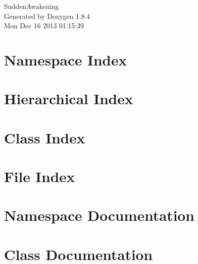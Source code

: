 \documentclass[twoside]{book}
\newcommand{\clearemptydoublepage}{%
  \newpage{\pagestyle{empty}\cleardoublepage}%
}
\begin{document}
\hypersetup{pageanchor=false}
\begin{titlepage}
\vspace*{7cm}
\begin{center}%
{\Large Sudden\-Awakening }\\
\vspace*{1cm}
{\large Generated by Doxygen 1.8.4}\\
\vspace*{0.5cm}
{\small Mon Dec 16 2013 01:15:39}\\
\end{center}
\end{titlepage}
\clearemptydoublepage
\tableofcontents
\clearemptydoublepage
{}
\hypersetup{pageanchor=true}

\chapter{Namespace Index}

\chapter{Hierarchical Index}

\chapter{Class Index}

\chapter{File Index}

\chapter{Namespace Documentation}




\chapter{Class Documentation}





































\end{document}

